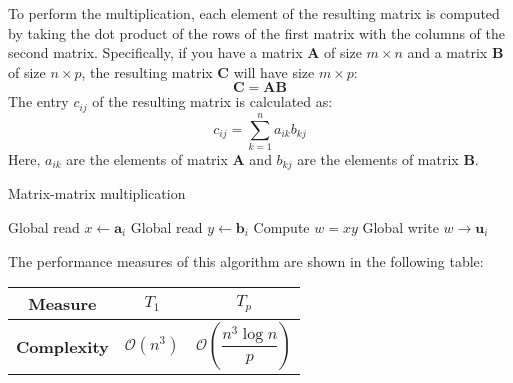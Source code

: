 To perform the multiplication, each element of the resulting matrix is computed by taking the dot product of the rows of the first matrix with the columns of the second matrix. 
Specifically, if you have a matrix $\mathbf{A}$ of size $m\times n$ and a matrix $\mathbf{B}$ of size $n\times p$, the resulting matrix $\mathbf{C}$ will have size $m\times p$:
\[\mathbf{C}=\mathbf{AB}\]
The entry $c_{ij}$ of the resulting matrix is calculated as:
\[c_{ij}=\sum_{k=1}^na_{ik}b_{kj}\]
Here, $a_{ik}$ are the elements of matrix $\mathbf{A}$ and $b_{kj}$ are the elements of matrix $\mathbf{B}$.
\begin{algorithm}[H]
    \caption{Matrix-matrix multiplication}
    \begin{algorithmic}[1]
        \State Global read $x \leftarrow \mathbf{a}_i$ 
        \State Global read $y \leftarrow \mathbf{b}_i$ 
        \State Compute $w = x y$ 
        \State Global write $w \rightarrow \mathbf{u}_i$ 
    \end{algorithmic}
\end{algorithm}  
The performance measures of this algorithm are shown in the following table:
\renewcommand*{\arraystretch}{2}
\begin{table}[H]
    \centering
    \begin{tabular}{|c|cc|}
    \hline
    \textbf{Measure} & $T_1$ & $T_p$ \\ \hline
    \textbf{Complexity} & $\mathcal{O}(n^3)$ & $\mathcal{O}\left(\dfrac{n^3\log n}{p}\right)$ \\ \hline
    \end{tabular}
\end{table}
\renewcommand*{\arraystretch}{1}